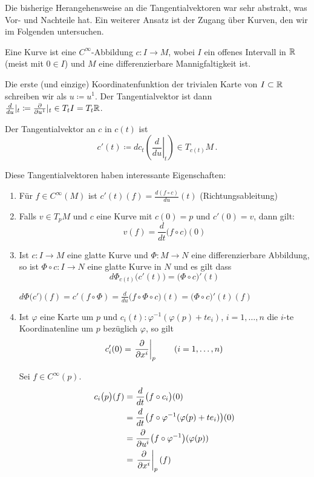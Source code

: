 \documentclass[a4paper,twoside,DIV15,BCOR12mm]{scrbook}
\renewcommand{\da}{\coloneqq}
\begin{document}
Die bisherige Herangehensweise an die Tangentialvektoren war sehr abstrakt, was Vor- und Nachteile hat. Ein weiterer Ansatz ist der Zugang über Kurven, den wir im Folgenden untersuchen.

Eine Kurve ist eine $C^\infty$-Abbildung $c:I\to M$, wobei $I$ ein offenes Intervall in $\mathbb{R}$ (meist mit $0\in I$) und $M$ eine differenzierbare Mannigfaltigkeit ist.

Die erste (und einzige) Koordinatenfunktion der trivialen Karte von $I\subset\mathbb{R}$ schreiben wir als $u\da u^1$. Der Tangentialvektor ist dann $\frac{d}{d u}|_t \da\frac{\partial}{\partial u^1}|_t \in T_tI = T_t\MdR$.

\begin{definition}
Der Tangentialvektor an $c$ in $c(t)$ ist
\[
c'(t) \da dc_t \left(\left. \frac d{du}\right|_t\right) \in T_{c(t)}M\,.
\]
\end{definition}

Diese Tangentialvektoren haben interessante Eigenschaften:
\begin{enumerate}
\item Für $f\in C^\infty(M)$ ist $c'(t)(f) = \frac{d(f\circ c)}{du}(t)$ (Richtungsableitung)
\item Falls $v\in T_pM$ und $c$ eine Kurve mit $c(0)=p$ und $c'(0) = v$, dann gilt:
\[
v(f) = \frac{d}{dt}\big(f\circ c\big) (0)
\]
\item Ist $c:I\to M$ eine glatte Kurve und $\Phi:M\to N$ eine differenzierbare Abbildung, so ist $\Phi \circ c: I \to N$ eine glatte Kurve in $N$ und es gilt dass
\[
d\Phi_{c(t)}\big(c'(t)\big) = \big(\Phi \circ c\big)'(t)
\]
\begin{beweis}
$d\Phi\big(c'\big)(f) = c'(f\circ \Phi) = \frac{d}{du}\big(f\circ \Phi \circ c\big) (t) 
= \big(\Phi \circ c\big)'(t)(f)$
\end{beweis}
\item Ist $\varphi$ eine Karte um $p$ und $c_i(t):\varphi^{-1}(\varphi(p) + te_i)$, $i=1,\ldots,n$ die $i$-te Koordinatenline um $p$ bezüglich $\varphi$, so gilt
\[
c_i'(0) = \left.\frac{\partial}{\partial x^{i}}\right|_p \qquad (i=1,\ldots,n)
\]
\begin{beweis}
Sei $f\in C^\infty(p)$.
\begin{align*}c_i\big(p\big) (f) &= \frac d{dt}\big(f\circ c_i\big)(0)  \\
&= \frac d{dt} \big(f\circ \varphi^{-1}(\varphi(p) + te_i)\big)(0) \\
&= \frac{\partial}{\partial u^i}\big(f\circ \varphi^{-1}\big)(\varphi(p))\\
&= \left.\frac{\partial}{\partial x^{i}}\right|_p(f)
\end{align*}
\end{beweis}
\end{enumerate}
\end{document}
